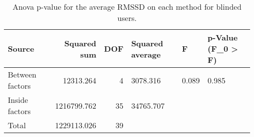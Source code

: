 
\begin{table}[!htb]
\centering
\caption{Anova p-value for the average RMSSD on each method for blinded users.}
\label{tab:anova_average_RMSSD}
\begin{tabular}{lrrlll}
\toprule
         Source &  Squared sum &  DOF & Squared average &     F & p-Value (F\_0 > F) \\
\midrule
Between factors &    12313.264 &    4 &        3078.316 & 0.089 &             0.985 \\
 Inside factors &  1216799.762 &   35 &       34765.707 &       &                   \\
          Total &  1229113.026 &   39 &                 &       &                   \\
\bottomrule
\end{tabular}
\end{table}

